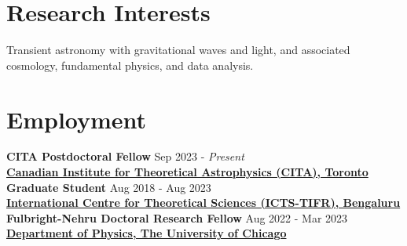 		
		\section{Research Interests}
		Transient astronomy with gravitational waves and light, and associated cosmology, fundamental physics, and data analysis.
		
		\section{Employment}
        \textbf{CITA Postdoctoral Fellow} \hfill Sep 2023 - \textit{Present}
		\\
            \vspace{0.4em}\textbf{\href{https://www.cita.utoronto.ca/}{Canadian Institute for Theoretical Astrophysics (CITA), Toronto}}\\
            \textbf{Graduate Student} \hfill Aug 2018 - Aug 2023
		\\
		\vspace{0.4em}\textbf{\href{https://www.icts.res.in/}{International Centre for Theoretical Sciences (ICTS-TIFR), Bengaluru}}\\
		\textbf{Fulbright-Nehru Doctoral Research Fellow } \hfill Aug 2022 - Mar 2023
		\\
		\textbf{\href{https://physics.uchicago.edu/}{Department of Physics, The University of Chicago}}
		
		
